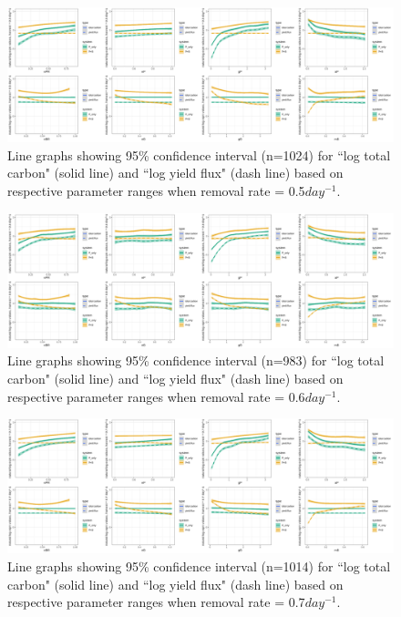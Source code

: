 \documentclass[../thesis.tex]{subfiles} %
\begin{document}
\begin{figure}[H]
    \centering
    \includegraphics[width=\linewidth]{../result/var_05.png}
    \caption[95\% distribution for $x=0.5day^{-1}$]{Line graphs showing 95\% confidence interval (n=1024) for ``log total carbon" (solid line) and ``log yield flux" (dash line) based on respective parameter ranges when removal rate = 0.5$day^{-1}$.}
    \label{fig:v05}
\end{figure}

\begin{figure}[H]
    \centering
    \includegraphics[width=\linewidth]{../result/var_06.png}
    \caption[95\% distribution for $x=0.6day^{-1}$]{Line graphs showing 95\% confidence interval (n=983) for ``log total carbon" (solid line) and ``log yield flux" (dash line) based on respective parameter ranges when removal rate = 0.6$day^{-1}$.}
    \label{fig:v06}
\end{figure}

\begin{figure}[H]
    \centering
    \includegraphics[width=\linewidth]{../result/var_07.png}
    \caption[95\% distribution for $x=0.7day^{-1}$]{Line graphs showing 95\% confidence interval (n=1014) for ``log total carbon" (solid line) and ``log yield flux" (dash line) based on respective parameter ranges when removal rate = 0.7$day^{-1}$.}
    \label{fig:v07}
\end{figure}
\end{document}
